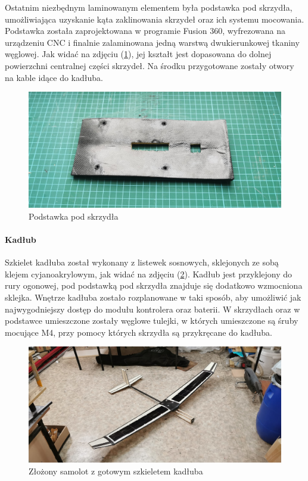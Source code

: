\documentclass[12pt, a4paper]{article}
\let\oldref\ref
\renewcommand{\ref}[1]{(\oldref{#1})}
\begin{document}
Ostatnim niezbędnym laminowanym elementem była podstawka pod skrzydła, umożliwiająca uzyskanie kąta zaklinowania skrzydeł oraz ich systemu mocowania. Podstawka została zaprojektowana w programie Fusion 360, wyfrezowana na urządzeniu CNC i finalnie zalaminowana jedną warstwą dwukierunkowej tkaniny węglowej. Jak widać na zdjęciu \ref{fig:podstawka}, jej kształt jest dopasowana do dolnej powierzchni centralnej części skrzydeł. Na środku przygotowane zostały otwory na kable idące do kadłuba.

 \begin{figure}[ht]
    \centering
    \includegraphics[width=1\textwidth]{podstawka}
    \caption{Podstawka pod skrzydła}
    \label{fig:podstawka}
\end{figure}

\FloatBarrier
\paragraph{Kadłub}\mbox{}

Szkielet kadłuba został wykonany z listewek sosnowych, sklejonych ze sobą klejem cyjanoakrylowym, jak widać na zdjęciu \ref{fig:szkielet}. Kadłub jest przyklejony do rury ogonowej, pod podstawką pod skrzydła znajduje się dodatkowo wzmocniona sklejka. Wnętrze kadłuba zostało rozplanowane w taki sposób, aby umożliwić jak najwygodniejszy dostęp do modułu kontrolera oraz baterii. W skrzydłach oraz w podstawce umieszczone zostały węglowe tulejki, w których umieszczone są śruby mocujące M4, przy pomocy których skrzydła są przykręcane do kadłuba. 

\begin{figure}[ht]
    \centering
    \includegraphics[width=1\textwidth]{szkielet}
    \caption{Złożony samolot z gotowym szkieletem kadłuba}
    \label{fig:szkielet}
\end{figure}
\end{document}

